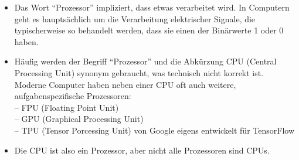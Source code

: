 	\begin{itemize}
		\item Das Wort “Prozessor” impliziert, dass etwas verarbeitet wird. In Computern geht es hauptsächlich um die Verarbeitung elektrischer Signale, die typischerweise so behandelt werden, dass sie einen der Binärwerte 1 oder 0 haben.
		\item Häufig werden der Begriff “Prozessor” und die Abkürzung CPU (Central Processing Unit) synonym gebraucht, was technisch nicht korrekt ist. Moderne Computer haben neben einer CPU oft auch weitere, aufgabenspezifische Prozessoren:\\
		--  FPU (Floating Point Unit)\\
		-- GPU (Graphical Processing Unit)\\
		-- TPU (Tensor Porcessing Unit) von Google eigens entwickelt für TensorFlow 
		\item Die CPU ist also ein Prozessor, aber nicht alle Prozessoren sind CPUs.
	\end{itemize}



